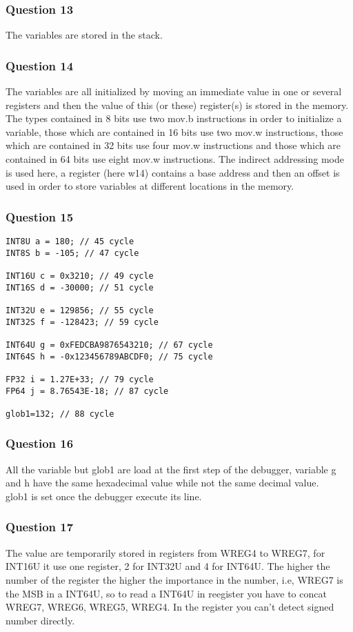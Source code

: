 \documentclass[a4paper,10pt]{article}
\begin{document}
\subsubsection*{Question 13}
The variables are stored in the stack.

\subsubsection*{Question 14}
The variables are all initialized by moving an immediate value in one or several registers and then the value of  this (or these) register(s) is stored in the memory. The types contained in 8 bits use two mov.b instructions in order to initialize a variable, those which are contained in 16 bits use two mov.w instructions, those which are contained in 32 bits use four mov.w instructions and those which are contained in 64 bits use eight mov.w instructions. The indirect addressing mode is used here, a register (here w14) contains a base address and then an offset is used in order to store variables at different locations in the memory.

\subsubsection*{Question 15}
\begin{verbatim}
INT8U a = 180; // 45 cycle
INT8S b = -105; // 47 cycle

INT16U c = 0x3210; // 49 cycle
INT16S d = -30000; // 51 cycle

INT32U e = 129856; // 55 cycle
INT32S f = -128423; // 59 cycle

INT64U g = 0xFEDCBA9876543210; // 67 cycle
INT64S h = -0x123456789ABCDF0; // 75 cycle

FP32 i = 1.27E+33; // 79 cycle
FP64 j = 8.76543E-18; // 87 cycle

glob1=132; // 88 cycle
\end{verbatim}

\subsubsection*{Question 16}
All the variable but glob1 are load at the first step of the debugger, variable g and h have the same hexadecimal value while not the same decimal value.\\
glob1 is set once the debugger execute its line.

\subsubsection*{Question 17}
The value are temporarily stored in registers from WREG4 to WREG7, for INT16U it use one register, 2 for INT32U and 4 for INT64U. The higher the number of the register the higher the importance in the number, i.e, WREG7 is the MSB in a INT64U, so to read a INT64U in reegister you have to concat WREG7, WREG6, WREG5, WREG4.
In the register you can't detect signed number directly.
\end{document}
